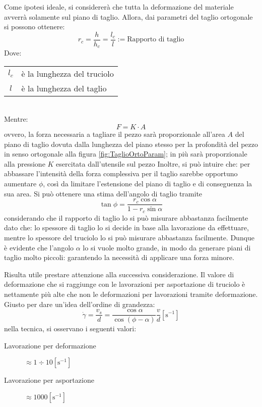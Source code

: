 Come ipotesi ideale, si considererà che tutta la deformazione del materiale avverrà
solamente sul piano di taglio.
Allora, dai parametri del taglio ortogonale si possono ottenere:
\begin{equation}
r_c = \frac{h}{h_c} = \frac{l_c}{l} := \text{Rapporto di taglio}
\end{equation}
Dove:\\
\begin{tabular}{cl}
$l_c$ & è la lunghezza del truciolo\\
$l$ & è la lunghezza del taglio\\
\end{tabular}
\\
Mentre:
\begin{equation}
F = K \cdot A
\end{equation}
ovvero, la forza necessaria a tagliare il pezzo sarà proporzionale all'area $A$ del piano di taglio 
dovuta dalla lunghezza del piano stesso per la profondità del pezzo in senso ortogonale alla 
figura \ref{fig:TaglioOrtoParam}; in più sarà proporzionale alla pressione $K$ esercitata dall'utensile sul pezzo
Inoltre, si può intuire che: per abbassare l'intensità della forza complessiva per il taglio
sarebbe opportuno aumentare $\phi$, così da limitare l'estensione del piano di taglio e di 
conseguenza la sua area.
Si può ottenere una stima dell'angolo di taglio tramite
\begin{equation}
\tan\phi = \frac{r_c \cos\alpha}{1-r_c\sin\alpha}
\end{equation}
considerando che il rapporto di taglio lo si può misurare abbastanza facilmente dato che:
lo spessore di taglio lo si decide in base alla lavorazione da effettuare, mentre lo
spessore del truciolo lo si può misurare abbastanza facilmente.
Dunque è evidente che l'angolo $\alpha$ lo si vuole molto grande, in modo da generare piani
di taglio molto piccoli: garantendo la necessità di applicare una forza minore.

Risulta utile prestare attenzione alla successiva considerazione.
Il valore di deformazione che si raggiunge con le lavorazioni per asportazione di truciolo
è nettamente più alte che non le deformazioni per lavorazioni tramite deformazione.
Giusto per dare un'idea dell'ordine di grandezza:
\begin{equation}
\dot{\gamma} = \frac{v_s}{d} = \frac{\cos\alpha}{\cos\left(\phi - \alpha\right)} \frac{v}{d} \left[\unit{\s^{-1}}\right]
\end{equation}
nella tecnica, si osservano i seguenti valori:
\begin{description}
\item[Lavorazione per deformazione] $\approx 1 \div 10 \left[\unit{\s^{-1}}\right]$
\item[Lavorazione per asportazione] $\approx 1000 \left[\unit{\s^{-1}}\right]$
\end{description}

